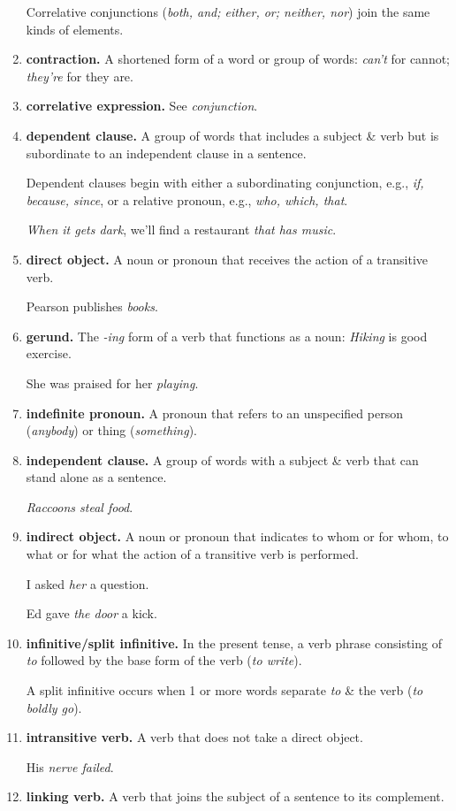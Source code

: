 \documentclass{article}
\begin{document}
\begin{enumerate}
	Correlative conjunctions ({\it both, and; either, or; neither, nor}) join the same kinds of elements.
	\item {\bf contraction.} A shortened form of a word or group of words: {\it can't} for cannot; {\it they're} for they are.
	\item {\bf correlative expression.} See {\it conjunction}.
	\item {\bf dependent clause.} A group of words that includes a subject \& verb but is subordinate to an independent clause in a sentence.
	
	Dependent clauses begin with either a subordinating conjunction, e.g., {\it if, because, since}, or a relative pronoun, e.g., {\it who, which, that}.
	
	{\it When it gets dark}, we'll find a restaurant {\it that has music}.
	\item {\bf direct object.} A noun or pronoun that receives the action of a transitive verb.
	
	Pearson publishes {\it books}.
	\item {\bf gerund.} The {\it -ing} form of a verb that functions as a noun: {\it Hiking} is good exercise.
	
	She was praised for her {\it playing}.
	\item {\bf indefinite pronoun.} A pronoun that refers to an unspecified person ({\it anybody}) or thing ({\it something}).
	\item {\bf independent clause.} A group of words with a subject \& verb that can stand alone as a sentence.
	
	{\it Raccoons steal food}.
	\item {\bf indirect object.} A noun or pronoun that indicates to whom or for whom, to what or for what the action of a transitive verb is performed.
	
	I asked {\it her} a question.
	
	Ed gave {\it the door} a kick.
	\item {\bf infinitive/split infinitive.} In the present tense, a verb phrase consisting of {\it to} followed by the base form of the verb ({\it to write}).
	
	A split infinitive occurs when 1 or more words separate {\it to} \& the verb ({\it to boldly go}).
	\item {\bf intransitive verb.} A verb that does not take a direct object.
	
	His {\it nerve failed}.
	\item {\bf linking verb.} A verb that joins the subject of a sentence to its complement.
	

\end{enumerate}
\end{document}

